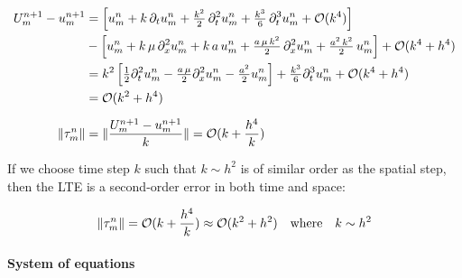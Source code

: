 \begin{align*}
  U_m^{n+1} - u_m^{n+1} & =
  \left[ u_m^n + k\,\partial_t u_m^n + \tfrac{k^2}{2}\,\partial_t^2 u_m^n + \tfrac{k^3}{6}\,\partial_t^3 u_m^n + \mathcal{O}(k^4) \right]                                                            \\
                        & - \left[ u_m^n + k\,\mu\,\partial_{x}^2 u_m^n + k\,a\,u_m^n + \tfrac{a\,\mu\,k^2}{2}\,\partial_{x}^2 u_m^n + \tfrac{a^2\,k^2}{2}\,u_m^n \right] + \mathcal{O}(k^4+h^4)     \\
                        & = k^2 \left[\tfrac{1}{2}\partial_t^2 u_m^n - \tfrac{a \,\mu}{2}\partial_{x}^2 u_m^n - \tfrac{a^2}{2}u_m^n\right] + \tfrac{k^3}{6}\partial_t^3 u_m^n + \mathcal{O}(k^4+h^4) \\
                        & = \mathcal{O}(k^2 + h^4)                                                                                                                                                   \\[2mm]
  \lVert\tau_m^n\rVert       & = \lVert\frac{U_m^{n+1} - u_m^{n+1}}{k}\rVert = \mathcal{O}(k + \frac{h^4}{k})                                                                                                  \\
\end{align*}

If we choose time step \(k\) such that \(k \sim h^2\) is of similar order as the spatial step, then the LTE is a second-order error in both time and space:

\begin{equation}
  \lVert\tau_m^n\rVert = \mathcal{O}(k + \frac{h^4}{k}) \approx \mathcal{O}(k^2 + h^2) \quad \text{where} \quad k \sim h^2
\end{equation}



\paragraph{System of equations}

